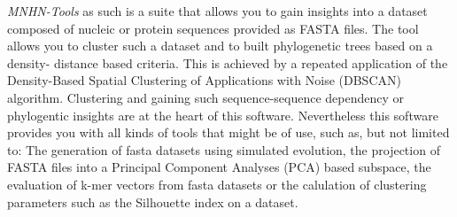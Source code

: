 \emph{MNHN-Tools} as such is a suite that allows you to gain insights
into a dataset composed of nucleic or protein sequences provided as
FASTA \cite{fasta} files. The tool allows you to cluster such a
dataset and to built phylogenetic trees based on a density- distance
based criteria. This is achieved by a repeated application of the
Density-Based Spatial Clustering of Applications with Noise (DBSCAN)
\cite{dbscan} algorithm. Clustering and gaining such sequence-sequence
dependency or phylogentic insights are at the heart of this
software. Nevertheless this software provides you with all kinds of
tools that might be of use, such as, but not limited to: The
generation of fasta datasets using simulated evolution, the projection
of FASTA files into a Principal Component Analyses (PCA) based subspace, the
evaluation of k-mer vectors from fasta datasets or the calulation of
clustering parameters such as the Silhouette \cite{silhoutte}
index on a dataset.
